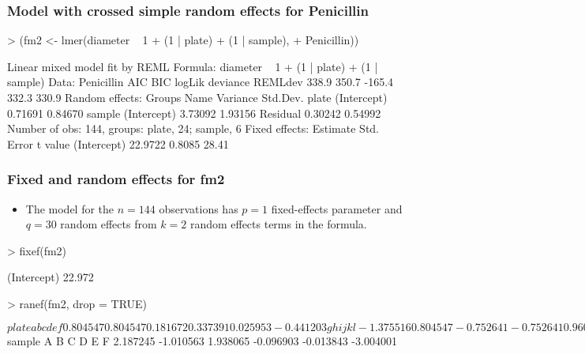\begin{frame}[fragile]
  \frametitle{Model with crossed simple random effects for Penicillin}
\begin{Schunk}
\begin{Sinput}
> (fm2 <- lmer(diameter ~ 1 + (1 | plate) + (1 | sample), 
+     Penicillin))
\end{Sinput}
\begin{Soutput}
Linear mixed model fit by REML 
Formula: diameter ~ 1 + (1 | plate) + (1 | sample) 
   Data: Penicillin 
   AIC   BIC logLik deviance REMLdev
 338.9 350.7 -165.4    332.3   330.9
Random effects:
 Groups   Name        Variance Std.Dev.
 plate    (Intercept) 0.71691  0.84670 
 sample   (Intercept) 3.73092  1.93156 
 Residual             0.30242  0.54992 
Number of obs: 144, groups: plate, 24; sample, 6
Fixed effects:
            Estimate Std. Error t value
(Intercept)  22.9722     0.8085   28.41
\end{Soutput}
\end{Schunk}
\end{frame}


\begin{frame}[fragile]
  \frametitle{Fixed and random effects for fm2}
  \begin{itemize}
  \item The model for the $n=144$ observations has $p=1$ fixed-effects
    parameter and $q=30$ random effects from $k=2$ random effects
    terms in the formula.
  \end{itemize}
\begin{Schunk}
\begin{Sinput}
> fixef(fm2)
\end{Sinput}
\begin{Soutput}
(Intercept) 
     22.972 
\end{Soutput}
\begin{Sinput}
> ranef(fm2, drop = TRUE)
\end{Sinput}
\begin{Soutput}
$plate
        a         b         c         d         e         f 
 0.804547  0.804547  0.181672  0.337391  0.025953 -0.441203 
        g         h         i         j         k         l 
-1.375516  0.804547 -0.752641 -0.752641  0.960266  0.493109 
        m         n         o         p         q         r 
 1.427422  0.493109  0.960266  0.025953 -0.285484 -0.285484 
        s         t         u         v         w         x 
-1.375516  0.960266 -0.908360 -0.285484 -0.596922 -1.219797 
$sample
        A         B         C         D         E         F 
 2.187245 -1.010563  1.938065 -0.096903 -0.013843 -3.004001 
\end{Soutput}
\end{Schunk}
\end{frame}


